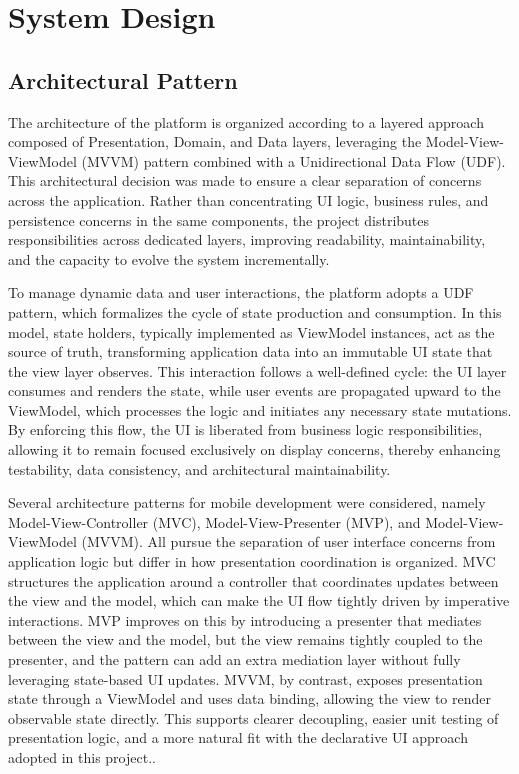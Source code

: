 \chapter{System Design}

\section{Architectural Pattern}
\label{sec:arch-pattern}


The architecture of the platform is organized according to a layered approach composed of Presentation, Domain, and Data layers, leveraging the Model-View-ViewModel (MVVM) pattern combined with a Unidirectional Data Flow (UDF). This architectural decision was made to ensure a clear separation of concerns across the application. Rather than concentrating UI logic, business rules, and persistence concerns in the same components, the project distributes responsibilities across dedicated layers, improving readability, maintainability, and the capacity to evolve the system incrementally.

To manage dynamic data and user interactions, the platform adopts a UDF pattern, which formalizes the cycle of state production and consumption. In this model, state holders, typically implemented as ViewModel instances, act as the source of truth, transforming application data into an immutable UI state that the view layer observes. This interaction follows a well-defined cycle: the UI layer consumes and renders the state, while user events are propagated upward to the ViewModel, which processes the logic and initiates any necessary state mutations. By enforcing this flow, the UI is liberated from business logic responsibilities, allowing it to remain focused exclusively on display concerns, thereby enhancing testability, data consistency, and architectural maintainability.\cite{udf}

Several architecture patterns for mobile development were considered, namely Model-View-Controller (MVC), Model-View-Presenter (MVP), and Model-View-ViewModel (MVVM). All pursue the separation of user interface concerns from application logic but differ in how presentation coordination is organized. MVC structures the application around a controller that coordinates updates between the view and the model, which can make the UI flow tightly driven by imperative interactions. MVP improves on this by introducing a presenter that mediates between the view and the model, but the view remains tightly coupled to the presenter, and the pattern can add an extra mediation layer without fully leveraging state-based UI updates. MVVM, by contrast, exposes presentation state through a ViewModel and uses data binding, allowing the view to render observable state directly. This supports clearer decoupling, easier unit testing of presentation logic, and a more natural fit with the declarative UI approach adopted in this project.\cite{mvvm}.

